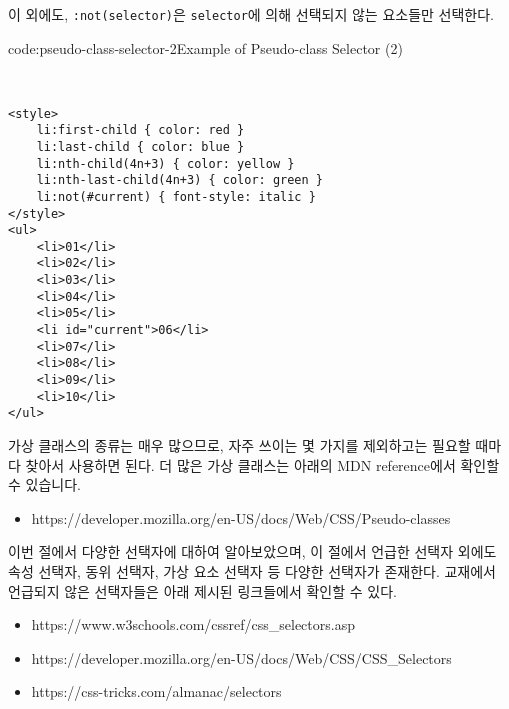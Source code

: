 이 외에도, \verb|:not(selector)|은 \verb|selector|에 의해 선택되지 않는 요소들만 선택한다.

\begin{codeenv}{code:pseudo-class-selector-2}{Example of Pseudo-class Selector (2)}\begin{verbatim}


<style>
    li:first-child { color: red }
    li:last-child { color: blue }
    li:nth-child(4n+3) { color: yellow }
    li:nth-last-child(4n+3) { color: green }
    li:not(#current) { font-style: italic }
</style>
<ul>
    <li>01</li>
    <li>02</li>
    <li>03</li>
    <li>04</li>
    <li>05</li>
    <li id="current">06</li>
    <li>07</li>
    <li>08</li>
    <li>09</li>
    <li>10</li>
</ul>
\end{verbatim}
\end{codeenv}

가상 클래스의 종류는 매우 많으므로, 자주 쓰이는 몇 가지를 제외하고는 필요할 때마다 찾아서 사용하면 된다. 더 많은 가상 클래스는 아래의 MDN reference에서 확인할 수 있습니다. 

\begin{itemize}
    \item https://developer.mozilla.org/en-US/docs/Web/CSS/Pseudo-classes
\end{itemize}

이번 절에서 다양한 선택자에 대하여 알아보았으며, 이 절에서 언급한 선택자 외에도 속성 선택자, 동위 선택자, 가상 요소 선택자 등 다양한 선택자가 존재한다. 교재에서 언급되지 않은 선택자들은 아래 제시된 링크들에서 확인할 수 있다.

\begin{itemize}
    \item https://www.w3schools.com/cssref/css\_selectors.asp
    \item https://developer.mozilla.org/en-US/docs/Web/CSS/CSS\_Selectors
    \item https://css-tricks.com/almanac/selectors
\end{itemize}
